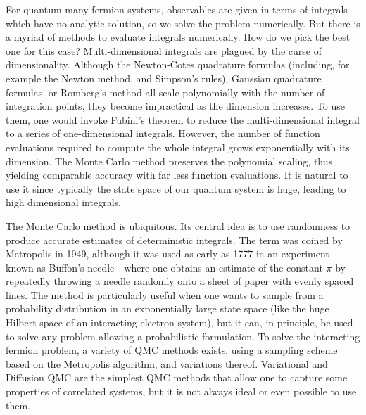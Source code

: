 For quantum many-fermion systems, observables are given in terms of integrals which have no analytic solution, so we solve the problem numerically.
But there is a myriad of methods to evaluate integrals numerically.
How do we pick the best one for this case? 
Multi-dimensional integrals are plagued by the curse of dimensionality.
Although the Newton-Cotes quadrature formulas (including, for example the Newton method, and Simpson's rules), Gaussian quadrature formulas, or Romberg's method all scale polynomially with the number of integration points, they become impractical as the dimension increases.
To use them, one would invoke Fubini's theorem to reduce the multi-dimensional integral to a series of one-dimensional integrals.
However, the number of function evaluations required to compute the whole integral grows exponentially with its dimension.
The Monte Carlo method preserves the polynomial scaling, thus yielding comparable accuracy with far less function evaluations.
It is natural to use it since typically the state space of our quantum system is huge, leading to high dimensional integrals.

The Monte Carlo method is ubiquitous.
Its central idea is to use randomness to produce accurate estimates of deterministic integrals.
The term was coined by Metropolis in 1949, although it was used as early as 1777 in an experiment known as Buffon's needle - where one obtains an estimate of the constant $\pi$ by repeatedly throwing a needle randomly onto a sheet of paper with evenly spaced lines. %
The method is particularly useful when one wants to sample from a probability distribution in an exponentially large state space (like the huge Hilbert space of an interacting electron system), but it can, in principle, be used to solve any problem allowing a probabilistic formulation.
To solve the interacting fermion problem, a variety of \ac{QMC} methods exists, using a sampling scheme based on the Metropolis algorithm, and variations thereof.
Variational and Diffusion \ac{QMC} are the simplest \ac{QMC} methods that allow one to capture some properties of correlated systems, but it is not always ideal or even possible to use them. 

